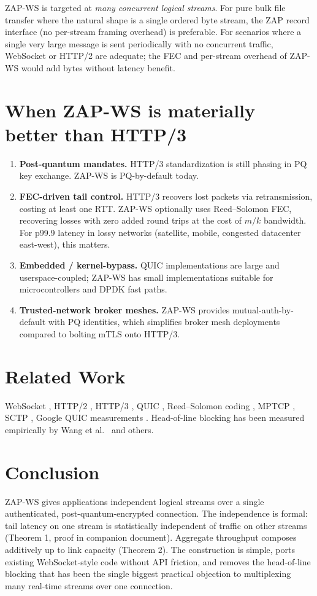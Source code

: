 \documentclass[11pt,a4paper]{article}
\begin{document}
ZAP-WS is targeted at \emph{many concurrent logical streams}. For pure
bulk file transfer where the natural shape is a single ordered byte
stream, the ZAP record interface (no per-stream framing overhead) is
preferable. For scenarios where a single very large message is sent
periodically with no concurrent traffic, WebSocket or HTTP/2 are
adequate; the FEC and per-stream overhead of ZAP-WS would add bytes
without latency benefit.

\section{When ZAP-WS is materially better than HTTP/3}

\begin{enumerate}
\item \textbf{Post-quantum mandates.} HTTP/3 standardization is still
phasing in PQ key exchange. ZAP-WS is PQ-by-default today.
\item \textbf{FEC-driven tail control.} HTTP/3 recovers lost packets via
retransmission, costing at least one RTT. ZAP-WS optionally uses
Reed--Solomon FEC, recovering losses with zero added round trips at the
cost of $m/k$ bandwidth. For p99.9 latency in lossy networks
(satellite, mobile, congested datacenter east-west), this matters.
\item \textbf{Embedded / kernel-bypass.} QUIC implementations are large
and userspace-coupled; ZAP-WS has small implementations suitable for
microcontrollers and DPDK fast paths.
\item \textbf{Trusted-network broker meshes.} ZAP-WS provides
mutual-auth-by-default with PQ identities, which simplifies broker
mesh deployments compared to bolting mTLS onto HTTP/3.
\end{enumerate}

\section{Related Work}

WebSocket \cite{rfc6455}, HTTP/2 \cite{rfc9113}, HTTP/3 \cite{rfc9114},
QUIC \cite{rfc9000}, Reed--Solomon coding \cite{reed1960}, MPTCP
\cite{rfc8684}, SCTP \cite{rfc4960}, Google QUIC measurements
\cite{langley2017quic}. Head-of-line blocking has been measured
empirically by Wang et al.\ \cite{wang2014http2hol} and others.

\section{Conclusion}

ZAP-WS gives applications independent logical streams over a single
authenticated, post-quantum-encrypted connection. The independence is
formal: tail latency on one stream is statistically independent of
traffic on other streams (Theorem 1, proof in companion document).
Aggregate throughput composes additively up to link capacity (Theorem 2).
The construction is simple, ports existing WebSocket-style code without
API friction, and removes the head-of-line blocking that has been the
single biggest practical objection to multiplexing many real-time
streams over one connection.



\end{document}
